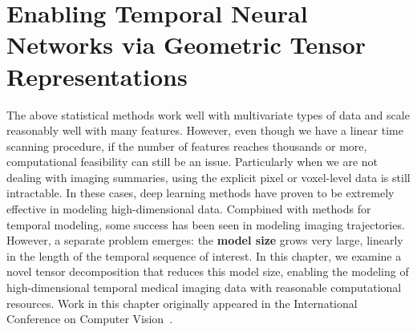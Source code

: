 \chapter{Enabling Temporal Neural Networks via Geometric Tensor Representations} \label{chap:ott} 

The above statistical methods work well with
multivariate types of data and scale reasonably well with many features.
However,
even though we have a linear time scanning procedure,
if the number of features reaches thousands or more,
computational feasibility can still be an issue.
Particularly when we are not dealing with
imaging summaries,
using the explicit pixel or voxel-level
data is still intractable.
In these cases,
deep learning methods have
proven to be extremely effective
in modeling high-dimensional data.
Compbined with methods
for temporal modeling,
some success has been seen
in modeling imaging trajectories.
However, a separate problem
emerges: the \textbf{model size}
grows very large, linearly 
in the length of the temporal sequence of interest.
In this chapter, we examine
a novel tensor decomposition
that reduces this model size,
enabling the modeling of high-dimensional
temporal medical imaging data
with reasonable computational resources.
Work in this chapter originally appeared in
the International Conference on Computer Vision~\citep{ott}.



%



